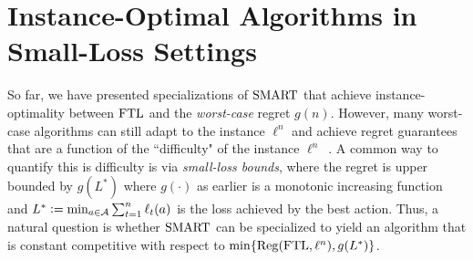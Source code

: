 \section{Instance-Optimal Algorithms in Small-Loss Settings} \label{sec:SmallLoss}


So far, we have presented specializations of $\text{SMART}$ that achieve instance-optimality between $\text{FTL}$ and the \emph{worst-case} regret $g(n)$. However, many worst-case algorithms can still adapt to the instance $\ell^n$ and achieve regret guarantees that are a function of the ``difficulty" of the instance $\ell^n$~\citep{Cesa-Bianchi--Lugosi2006, de2014follow, koolen2015second, luo2015achieving, orabona2018scale}. A common way to quantify this is difficulty is via \emph{small-loss bounds}, where the regret is upper bounded by $g(L^*)$ where $g(\cdot)$ as earlier is a monotonic increasing function and $L^* \mathrel{\mathop{:}}= \min_{a \in \mathcal{A}} \sum_{t=1}^n \ell_{t}(a)$ is the loss achieved by the best action. Thus, a natural question is whether $\text{SMART}$ can be specialized to yield an algorithm that is constant competitive with respect to $\min\{\mathrm{Reg}(\text{FTL}, \ell^n), g(L^*)\}$.  

